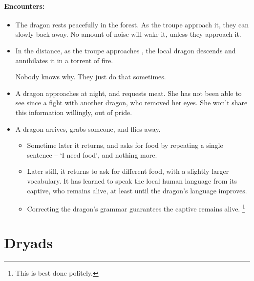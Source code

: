 \begin{multicols}{2}
\showStdSpells

\paragraph{Encounters:}

\begin{itemize}
  \item
  The dragon rests peacefully in the forest.
  As the troupe approach it, they can slowly back away.
  No amount of noise will wake it, unless they approach it.
  \item
  In the distance, as the troupe approaches , the local dragon descends and annihilates it in a torrent of fire.

  Nobody knows why.
  They just do that sometimes.
  \item
  A dragon approaches  at night, and requests meat.
  She has not been able to see since a fight with another dragon, who removed her eyes.
  She won't share this information willingly, out of pride.
  \item
  A dragon arrives, grabs someone, and flies away.
  \begin{itemize}
    \item
    Sometime later it returns, and asks for food by repeating a single sentence -- `I need food', and nothing more.
    \item
    Later still, it returns to ask for different food, with a slightly larger vocabulary.
    It has learned to speak the local human language from its captive, who remains alive, at least until the dragon's language improves.
    \item
    Correcting the dragon's grammar guarantees the captive remains alive.%
    \footnote{This is best done politely.}
  \end{itemize}
\end{itemize}

\end{multicols}

\section[Dryad]{Dryads}
\label{dryad}


